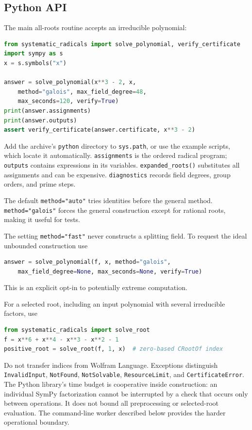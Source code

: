 \documentclass[11pt,a4paper]{article}
\theoremstyle{definition}
\theoremstyle{remark}
\newcommand{\code}[1]{\texttt{#1}}
\begin{document}
\subsection{Python API}
The main all-roots routine accepts an irreducible polynomial:
\begin{lstlisting}[language=Python]
from systematic_radicals import solve_polynomial, verify_certificate
import sympy as s
x = s.symbols("x")

answer = solve_polynomial(x**3 - 2, x,
    method="galois", max_field_degree=48,
    max_seconds=120, verify=True)
print(answer.assignments)
print(answer.outputs)
assert verify_certificate(answer.certificate, x**3 - 2)
\end{lstlisting}
Add the archive's \code{python} directory to \code{sys.path}, or use the example
scripts, which locate it automatically. \code{assignments} is the ordered
radical program; \code{outputs} contains expressions in its variables.
\code{expanded\_roots()} substitutes all assignments and can be expensive.
\code{diagnostics} records field degrees, group orders, and prime steps.

The default \code{method="auto"} tries identities before the general method.
\code{method="galois"} forces the general construction except for rational
roots, making it useful for tests.

The setting \code{method="fast"} never constructs a splitting field. To request the ideal unbounded construction use
\begin{lstlisting}[language=Python]
answer = solve_polynomial(f, x, method="galois",
    max_field_degree=None, max_seconds=None, verify=True)
\end{lstlisting}
This is an explicit opt-in to potentially extreme computation.

For a selected root, including an input polynomial with several irreducible
factors, use
\begin{lstlisting}[language=Python]
from systematic_radicals import solve_root
f = x**6 + x**4 - x**3 - x**2 - 1
positive_root = solve_root(f, 1, x)  # zero-based CRootOf index
\end{lstlisting}
Do not transfer indices from Wolfram Language. Exceptions distinguish
\code{InvalidInput}, \code{NotFound}, \code{NotSolvable},
\code{ResourceLimit}, and \code{CertificateError}. The Python library's time
budget is cooperative inside construction: an individual SymPy factorization
cannot be interrupted by a check that occurs only between operations. It does
not bound all preprocessing or selected-root evaluation. The command-line
worker described below provides the harder operational boundary.
\end{document}
